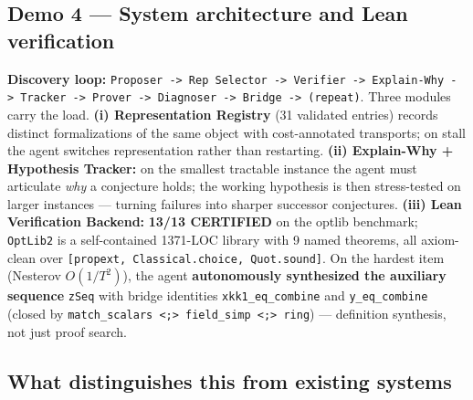 \documentclass[
  10.5pt,
]{article}
\begin{document}
\subsection{Demo 4 --- System architecture and Lean
verification}\label{demo-4-system-architecture-and-lean-verification}

\textbf{Discovery loop:}
\texttt{Proposer\ -\textgreater{}\ Rep\ Selector\ -\textgreater{}\ Verifier\ -\textgreater{}\ Explain-Why\ -\textgreater{}\ Tracker\ -\textgreater{}\ Prover\ -\textgreater{}\ Diagnoser\ -\textgreater{}\ Bridge\ -\textgreater{}\ (repeat)}.
Three modules carry the load. \textbf{(i) Representation Registry} (31
validated entries) records distinct formalizations of the same object
with cost-annotated transports; on stall the agent switches
representation rather than restarting. \textbf{(ii) Explain-Why +
Hypothesis Tracker:} on the smallest tractable instance the agent must
articulate \emph{why} a conjecture holds; the working hypothesis is then
stress-tested on larger instances --- turning failures into sharper
successor conjectures. \textbf{(iii) Lean Verification Backend:}
\textbf{13/13 CERTIFIED} on the optlib benchmark; \texttt{OptLib2} is a
self-contained 1371-LOC library with 9 named theorems, all axiom-clean
over \texttt{{[}propext,\ Classical.choice,\ Quot.sound{]}}. On the
hardest item (Nesterov \(O(1/T^2)\)), the agent \textbf{autonomously
synthesized the auxiliary sequence} \texttt{zSeq} with bridge identities
\texttt{xkk1\_eq\_combine} and \texttt{y\_eq\_combine} (closed by
\texttt{match\_scalars\ \textless{};\textgreater{}\ field\_simp\ \textless{};\textgreater{}\ ring})
--- definition synthesis, not just proof search.

\subsection{What distinguishes this from existing
systems}\label{what-distinguishes-this-from-existing-systems}
\end{document}
